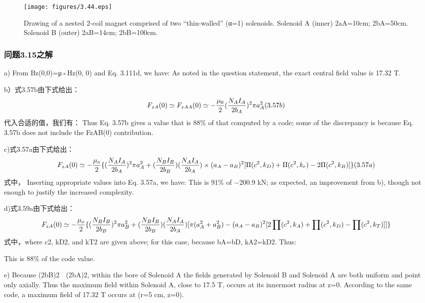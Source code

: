 \begin{figure}[htbp]
	\centering
	\texttt{[image: figures/3.44.eps]}
	\caption{Drawing of a nested 2-coil magnet comprised of two “thin-walled” (α=1)
		solenoids. Solenoid A (inner) 2aA=10cm; 2bA=50cm. Solenoid B (outer) 2aB=14cm;
		2bB=100cm.}
\end{figure}

\subsubsection{问题3.15之解}
a) From Bz(0,0)=μ◦Hz(0, 0) and Eq. 3.111d, we have:
As noted in the question statement, the exact central field value is 17.32 T.

b）式3.57b由下式给出：
$$
F_{zA}(0)\simeq F_{zAA}(0)\simeq-\frac{\mu_{0}}{2}(\frac{N_{A}I_{A}}{2b_{A}})^{2}\pi a_{A}^{2}\\(3.57b)
$$
代入合适的值，我们有：
Thus Eq. 3.57b gives a value that is 88\% of that computed by a code; some of the
discrepancy is because Eq. 3.57b does not include the FzAB(0) contribution.

c)式3.57a由下式给出：
$$
F_{zA}(0)\simeq-\frac{\mu_{o}}{2}\{(\frac{N_{A}I_{A}}{2b_{A}})^{2}\pi a_{A}^{2}+(\frac{N_{B}I_{B}}{2b_{B}})(\frac{N_{A}I_{A}}{2b_{A}})\times\\
(a_{A}-a_{B})^{2}[\Pi(c^{2},k_{D})+\Pi(c^{2},k_{r})-2\Pi(c^{2},k_{B})]\}\\(3.57a)
$$
式中，
Inserting appropriate values into Eq. 3.57a, we have:
This is 91\% of −200.9 kN; as expected, an improvement from b), though not
enough to justify the increased complexity.

d)式3.59a由下式给出：
$$
F_{zA}(0)\simeq-\frac{\mu_{o}}{2}\{(\frac{N_{B}I_{B}}{2b_{B}})^{2}\pi a_{B}^{2}+(\frac{N_{B}I_{B}}{2b_{B}})(\frac{N_{A}I_{A}}{2b_{A}})[\pi(a_{A}^{2}+a_{B}^{2})\\
-(a_{A}-a_{B})^{2}[2\prod(c^{2},k_{A})+\prod(c^{2},k_{D})-\prod(c^{2},k_{T})]]\}\\%
$$
式中，where c2, kD2, and kT2 are given above; for this case, because bA=bD, kA2=kD2. Thus:

This is 88\% of the code value.

e) Because (2bB)2  (2bA)2, within the bore of Solenoid A the fields generated
by Solenoid B and Solenoid A are both uniform and point only axially. Thus the
maximum field within Solenoid A, close to 17.5 T, occurs at its innermost radius at
z=0. According to the same code, a maximum field of 17.32 T occurs at (r=5 cm,
z=0).

